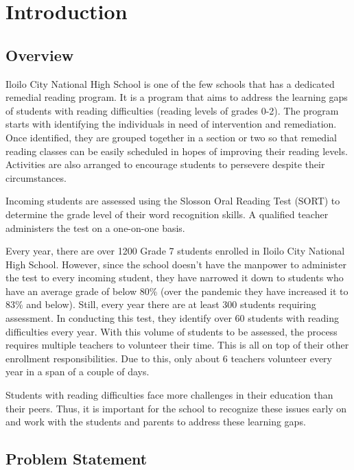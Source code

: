 \chapter{Introduction}
\label{sec:researchdesc}    %

\section{Overview}
\label{sec:overview}
Iloilo City National High School is one of the few schools that has a dedicated remedial reading program. It is a program that aims to address the learning gaps of students with reading difficulties (reading levels of grades 0-2). The program starts with identifying the individuals in need of intervention and remediation. Once identified, they are grouped together in a section or two so that remedial reading classes can be easily scheduled in hopes of improving their reading levels. Activities are also arranged to encourage students to persevere despite their circumstances.

Incoming students are assessed using the Slosson Oral Reading Test (SORT) to determine the grade level of their word recognition skills. A qualified teacher administers the test on a one-on-one basis.

Every year, there are over 1200 Grade 7 students enrolled in Iloilo City National High School. However, since the school doesn’t have the manpower to administer the test to every incoming student, they have narrowed it down to students who have an average grade of below 80\% (over the pandemic they have increased it to 83\% and below). Still, every year there are at least 300 students requiring assessment. In conducting this test, they identify over 60 students with reading difficulties every year. With this volume of students to be assessed, the process requires multiple teachers to volunteer their time. This is all on top of their other enrollment responsibilities. Due to this, only about 6 teachers volunteer every year in a span of a couple of days.

Students with reading difficulties face more challenges in their education than their peers. Thus, it is important for the school to recognize these issues early on and work with the students and parents to address these learning gaps.

\section{Problem Statement}
\label{sec:problemstatement}

